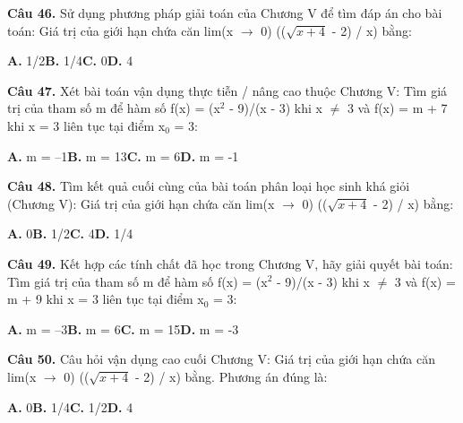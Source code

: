 \documentclass[11pt,a4paper]{article}
\begin{document}
\textbf{\color{primary} Câu 46.} Sử dụng phương pháp giải toán của Chương V để tìm đáp án cho bài toán: Giá trị của giới hạn chứa căn lim(x $\to$ 0) (($\sqrt{x + 4}$ - 2) / x) bằng:\par
\hspace*{1.5em}\textbf{A.} 1/2\quad\quad \textbf{B.} 1/4\quad\quad \textbf{C.} 0\quad\quad \textbf{D.} 4\par\vspace{2pt}
\textbf{\color{primary} Câu 47.} Xét bài toán vận dụng thực tiễn / nâng cao thuộc Chương V: Tìm giá trị của tham số m để hàm số f(x) = (x$^2$ - 9)/(x - 3) khi x $\ne$ 3 và f(x) = m + 7 khi x = 3 liên tục tại điểm x$_0$ = 3:\par
\hspace*{1.5em}\textbf{A.} m = --1\quad\quad \textbf{B.} m = 13\quad\quad \textbf{C.} m = 6\quad\quad \textbf{D.} m = -1\par\vspace{2pt}
\textbf{\color{primary} Câu 48.} Tìm kết quả cuối cùng của bài toán phân loại học sinh khá giỏi (Chương V): Giá trị của giới hạn chứa căn lim(x $\to$ 0) (($\sqrt{x + 4}$ - 2) / x) bằng:\par
\hspace*{1.5em}\textbf{A.} 0\quad\quad \textbf{B.} 1/2\quad\quad \textbf{C.} 4\quad\quad \textbf{D.} 1/4\par\vspace{2pt}
\textbf{\color{primary} Câu 49.} Kết hợp các tính chất đã học trong Chương V, hãy giải quyết bài toán: Tìm giá trị của tham số m để hàm số f(x) = (x$^2$ - 9)/(x - 3) khi x $\ne$ 3 và f(x) = m + 9 khi x = 3 liên tục tại điểm x$_0$ = 3:\par
\hspace*{1.5em}\textbf{A.} m = --3\quad\quad \textbf{B.} m = 6\quad\quad \textbf{C.} m = 15\quad\quad \textbf{D.} m = -3\par\vspace{2pt}
\textbf{\color{primary} Câu 50.} Câu hỏi vận dụng cao cuối Chương V: Giá trị của giới hạn chứa căn lim(x $\to$ 0) (($\sqrt{x + 4}$ - 2) / x) bằng. Phương án đúng là:\par
\hspace*{1.5em}\textbf{A.} 0\quad\quad \textbf{B.} 1/4\quad\quad \textbf{C.} 1/2\quad\quad \textbf{D.} 4\par\vspace{2pt}
\end{document}
